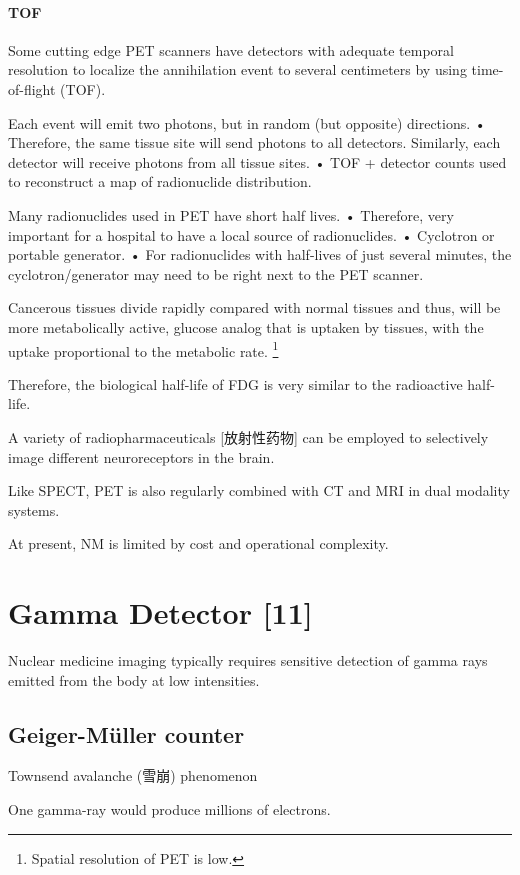 \documentclass[UTF8,a4paper,11pt]{book}
\theoremstyle{mystyle}{
  \newtheorem{example}{Example}
}
\begin{document}
\paragraph{TOF} Some cutting edge PET scanners have
detectors with adequate temporal resolution
to localize the annihilation event to several
centimeters by using time-of-flight (TOF).

 Each event will emit two photons, but in
random (but opposite) directions.
• Therefore, the same tissue site will send
photons to all detectors.
 Similarly, each detector will receive photons
from all tissue sites.
• TOF + detector counts used to reconstruct a
map of radionuclide distribution.

Many radionuclides used in PET have short
half lives.
• Therefore, very important for a hospital to
have a local source of radionuclides.
• Cyclotron or portable generator.
• For radionuclides with half-lives of just several
minutes, the cyclotron/generator may need to
be right next to the PET scanner.

Cancerous tissues divide
rapidly compared with
normal tissues and thus, will
be more metabolically active, glucose analog
that is uptaken by tissues,
with the uptake proportional
to the metabolic rate. \footnote{Spatial resolution of PET is low.}

Therefore, the biological half-life of FDG is
very similar to the radioactive half-life.

A variety of radiopharmaceuticals [放射性药物] can be
employed to selectively image different
neuroreceptors in the brain.

 Like SPECT, PET is also regularly combined
with CT and MRI in dual modality systems.


 At present, NM is limited by cost and
operational complexity.

\section{Gamma Detector [11]}

Nuclear medicine imaging typically requires
sensitive detection of gamma rays emitted
from the body at low intensities.
\subsection{Geiger-M\"{u}ller counter}


Townsend avalanche (雪崩) phenomenon

One gamma-ray would produce millions of electrons.
\end{document}

